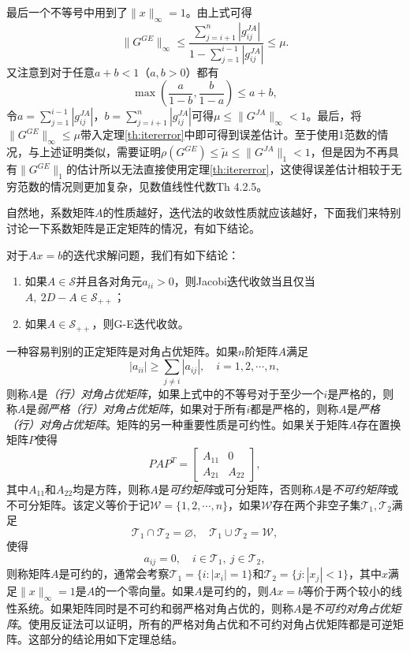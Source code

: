 \documentclass[a4paper,10pt]{ctexart}
\begin{document}
最后一个不等号中用到了$ \| x \|_\infty=1 $。由上式可得
\[
    \| G^{GE} \|_\infty \leqslant  \frac{\sum_{j=i+1}^{n}|g^{JA}_{ij}|}{1-\sum_{j=1}^{i-1}|g^{JA}_{ij}|} \leqslant \mu.
\]
又注意到对于任意$ a+b<1 $（$ a,b>0 $）都有
\[
    \max \left( \frac{a}{1-b}, \frac{b}{1-a} \right) \leqslant a+b,
\]
令$ a = \sum_{j=1}^{i-1}|g^{JA}_{ij}| $，$ b = \sum_{j=i+1}^{n}|g^{JA}_{ij}| $可得$ \mu \leqslant  \| G^{JA} \|_\infty <1 $。最后，将$ \| G^{GE} \|_\infty\leqslant \mu $带入定理\ref{th:itererror}中即可得到误差估计。至于使用1范数的情况，与上述证明类似，需要证明$ \rho(G^{GE})\leqslant \tilde{\mu}\leqslant \| G^{JA} \|_1<1 $，但是因为不再具有$ \| G^{GE} \|_1 $的估计所以无法直接使用定理\ref{th:itererror}，这使得误差估计相较于无穷范数的情况则更加复杂，见数值线性代数Th 4.2.5。

自然地，系数矩阵$ A $的性质越好，迭代法的收敛性质就应该越好，下面我们来特别讨论一下系数矩阵是正定矩阵的情况，有如下结论。
\begin{theorem}
    对于$ Ax=b $的迭代求解问题，我们有如下结论：
    \begin{enumerate}
        \item 如果$ A\in \mathcal{S} $并且各对角元$ a_{ii}>0 $，则Jacobi迭代收敛当且仅当$ A,\ 2D-A\in \mathcal{S}_{++} $；
        \item 如果$ A\in \mathcal{S}_{++} $，则G-E迭代收敛。
    \end{enumerate}
\end{theorem}
一种容易判别的正定矩阵是对角占优矩阵。如果$ n $阶矩阵$ A $满足
\[
    |a_{ii}| \geqslant  \sum_{j\neq i} |a_{ij}|,\quad i=1,2,\cdots,n,
\]
则称$ A $是\emph{（行）对角占优矩阵}，如果上式中的不等号对于至少一个$ i $是严格的，则称$ A $是\emph{弱严格（行）对角占优矩阵}，如果对于所有$ i $都是严格的，则称$ A $是\emph{严格（行）对角占优矩阵}。矩阵的另一种重要性质是可约性。如果关于矩阵$ A $存在置换矩阵$ P $使得
\[
    PAP^T = 
    \begin{bmatrix} 
        A_{11} & 0 \\
        A_{21} & A_{22} 
    \end{bmatrix},
\]
其中$ A_{11} $和$ A_{22} $均是方阵，则称$ A $是\emph{可约矩阵}或可分矩阵，否则称$ A $是\emph{不可约矩阵}或不可分矩阵。该定义等价于记$ \mathcal{W} = \{1,2,\cdots ,n\} $，如果$ \mathcal{W} $存在两个非空子集$ \mathcal{T}_1,\mathcal{T}_2 $满足
\[
    \mathcal{T}_1 \cap \mathcal{T}_2 = \varnothing ,\quad \mathcal{T}_1 \cup \mathcal{T}_2 = \mathcal{W},
\]使得
\[
    a_{ij} = 0, \quad i\in \mathcal{T}_1,\ j\in \mathcal{T}_2,
\]
则称矩阵$ A $是可约的，通常会考察$ \mathcal{T}_1= \{i:|x_i|=1\} $和$ \mathcal{T}_2 = \{j:|x_j|<1\} $，其中$ x $满足$ \| x \|_\infty = 1 $是$ A $的一个零向量。如果$ A $是可约的，则$ Ax=b $等价于两个较小的线性系统。如果矩阵同时是不可约和弱严格对角占优的，则称$ A $是\emph{不可约对角占优矩阵}。使用反证法可以证明，所有的严格对角占优和不可约对角占优矩阵都是可逆矩阵。这部分的结论用如下定理总结。
\end{document}
